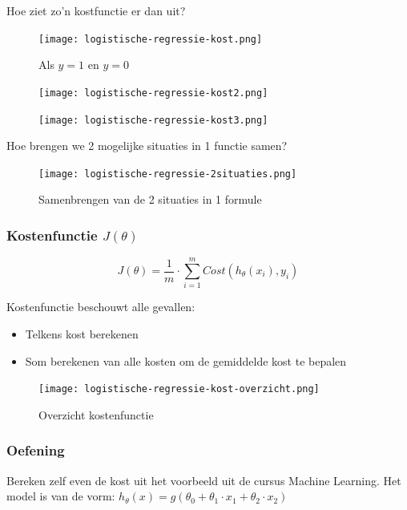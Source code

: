 \documentclass{article}
\begin{document}
Hoe ziet zo'n kostfunctie er dan uit?

\begin{figure}[H]
    \centering
    \texttt{[image: logistische-regressie-kost.png]}
    \caption{Als $y = 1$ en $y = 0$}
\end{figure}

\begin{figure}[H]
    \centering
    \texttt{[image: logistische-regressie-kost2.png]}
\end{figure}

\begin{figure}[H]
    \centering
    \texttt{[image: logistische-regressie-kost3.png]}
\end{figure}

Hoe brengen we 2 mogelijke situaties in 1 functie samen?

\begin{figure}[H]
    \centering
    \texttt{[image: logistische-regressie-2situaties.png]}
    \caption{Samenbrengen van de 2 situaties in 1 formule}
\end{figure}

\subsubsection{Kostenfunctie $J(\theta)$}

\begin{equation}
    J(\theta) = \frac{1}{m} \cdot \sum_{i=1}^m Cost(h_{\theta}(x_i), y_i)
\end{equation}

Kostenfunctie beschouwt alle gevallen:

\begin{itemize}
    \item Telkens kost berekenen
    \item Som berekenen van alle kosten om de gemiddelde kost te bepalen
\end{itemize}

\begin{figure}[H]
    \centering
    \texttt{[image: logistische-regressie-kost-overzicht.png]}
    \caption{Overzicht kostenfunctie}
\end{figure}

\subsubsection{Oefening}

Bereken zelf even de kost uit het voorbeeld uit de cursus Machine Learning. 
Het model is van de vorm: $h_{\theta}(x) = g(\theta_0 + \theta_1\cdot x_1 + \theta_2\cdot x_2)$
\end{document}
